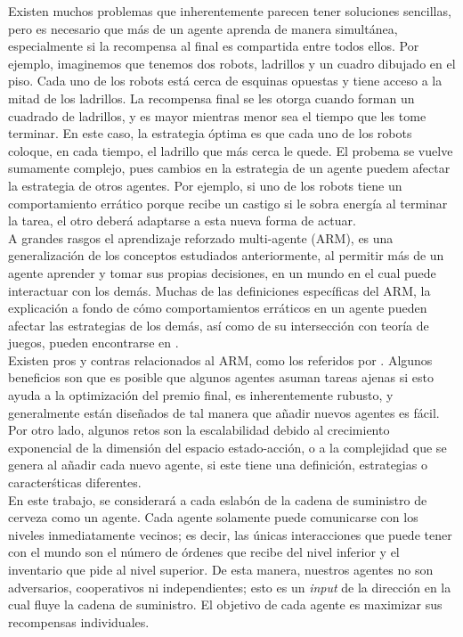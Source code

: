 Existen muchos problemas que inherentemente parecen tener soluciones sencillas, pero es necesario que m\'as de un agente aprenda de manera simult\'anea, especialmente si la recompensa al final es compartida entre todos ellos. Por ejemplo, imaginemos que tenemos dos robots, ladrillos y un cuadro dibujado en el piso. Cada uno de los robots est\'a cerca de esquinas opuestas y tiene acceso a la mitad de los ladrillos. La recompensa final se les otorga cuando forman un cuadrado de ladrillos, y es mayor mientras menor sea el tiempo que les tome terminar. En este caso, la estrategia \'optima es que cada uno de los robots coloque, en cada tiempo, el ladrillo que m\'as cerca le quede. El probema se vuelve sumamente complejo, pues cambios en la estrategia de un agente puedem afectar la estrategia de otros agentes. Por ejemplo, si uno de los robots tiene un comportamiento err\'atico porque recibe un castigo si le sobra energ\'ia al terminar la tarea, el otro deber\'a adaptarse a esta nueva forma de actuar.\\

A grandes rasgos el aprendizaje reforzado multi-agente (ARM), es una generalizaci\'on de los conceptos estudiados anteriormente, al permitir m\'as de un agente aprender y tomar sus propias decisiones, en un mundo en el cual puede interactuar con los dem\'as. Muchas de las definiciones espec\'ificas del ARM, la explicaci\'on a fondo de c\'omo comportamientos err\'aticos en un agente pueden afectar las estrategias de los dem\'as, as\'i como de su intersecci\'on con teor\'ia de juegos, pueden encontrarse en \citet{Bloembergen}. \\

Existen pros y contras relacionados al ARM, como los referidos por \citet{Busoniu}. Algunos beneficios son que es posible que algunos agentes asuman tareas ajenas si esto ayuda a la optimizaci\'on del premio final, es inherentemente rubusto, y generalmente est\'an dise\~nados de tal manera que a\~nadir nuevos agentes es f\'acil. Por otro lado, algunos retos son la escalabilidad debido al crecimiento exponencial de la dimensi\'on del espacio estado-acci\'on, o a la complejidad que se genera al a\~nadir cada nuevo agente, si este tiene una definici\'on, estrategias o caracter\'sticas diferentes.\\

En este trabajo, se considerar\'a a cada eslab\'on de la cadena de suministro de cerveza como un agente. Cada agente solamente puede comunicarse con los niveles inmediatamente vecinos; es decir, las \'unicas interacciones que puede tener con el mundo son el n\'umero de \'ordenes que recibe del nivel inferior y el inventario que pide al nivel superior. De esta manera, nuestros agentes no son adversarios, cooperativos ni independientes; esto es un \textit{input} de la direcci\'on en la cual fluye la cadena de suministro. El objetivo de cada agente es maximizar sus recompensas individuales.\\

